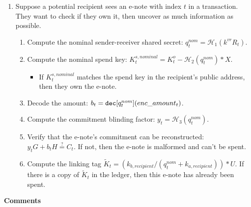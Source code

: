 \begin{enumerate}
    \item Suppose a potential recipient sees an e-note with index $t$ in a transaction. They want to check if they own it, then uncover as much information as possible.
    \begin{enumerate}
        \item Compute the nominal sender-receiver shared secret: $q^{nom}_t = \mathcal{H}_1(k^{vr} R_t)$.
        \item Compute the nominal spend key: $K^{s,nominal}_t = K^o_t - \mathcal{H}_2(q^{nom}_t)*X$.
        \begin{itemize}
            \item If $K^{s,nominal}_t$ matches the spend key in the recipient's public address, then they own the e-note.
        \end{itemize}
        \item Decode the amount: $b_t = \textrm{\tt dec}[q^{nom}_t](enc\_amount_t)$.
        \item Compute the commitment blinding factor: $y_t = \mathcal{H}_3(q^{nom}_t)$.
        \item Verify that the e-note's commitment can be reconstructed: $y_t G + b_t H \stackrel{?}{=} C_t$. If not, then the e-note is malformed and can't be spent.
        \item Compute the linking tag $\tilde{K}_t = (k_{b,recipient}/(q^{nom}_t + k_{a,recipient}))*U$. If there is a copy of $\tilde{K}_t$ in the ledger, then this e-note has already been spent.
    \end{enumerate}
\end{enumerate}

\textbf{Comments}

